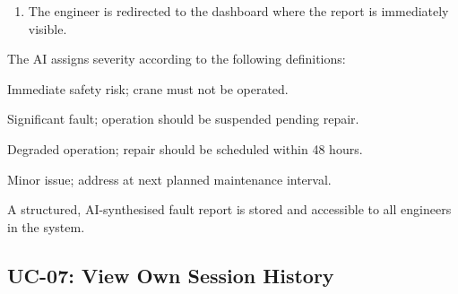 \begin{description}
\begin{enumerate}[noitemsep]
            \item The engineer is redirected to the dashboard where the report is
                  immediately visible.
        \end{enumerate}
    \item[Severity Classification Criteria]
        The AI assigns severity according to the following definitions:
        \begin{description}[noitemsep]
            \item[\texttt{critical}] Immediate safety risk; crane must not be operated.
            \item[\texttt{high}] Significant fault; operation should be suspended pending repair.
            \item[\texttt{medium}] Degraded operation; repair should be scheduled within 48 hours.
            \item[\texttt{low}] Minor issue; address at next planned maintenance interval.
        \end{description}
    \item[Postcondition]
        A structured, AI-synthesised fault report is stored and accessible to all
        engineers in the system.
\end{description}

\subsection{UC-07: View Own Session History\label{sec:uc07}}

